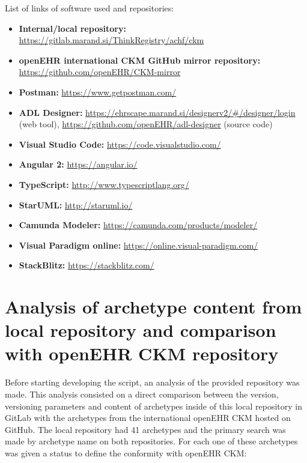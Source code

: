 \documentclass[mim_thesis.tex]{subfiles}
\begin{document}
List of links of software used and repositories: 
\begin{itemize}[noitemsep]
\item \textbf{Internal/local repository:} \url{https://gitlab.marand.si/ThinkRegistry/achf/ckm}
\item \textbf{openEHR international CKM GitHub mirror repository:} \url{https://github.com/openEHR/CKM-mirror}
\item \textbf{Postman:} \url{https://www.getpostman.com/}
\item \textbf{ADL Designer:} \url{https://ehrscape.marand.si/designerv2/#/designer/login} (web tool), \url{https://github.com/openEHR/adl-designer} (source code)
\item \textbf{Visual Studio Code:} \url{https://code.visualstudio.com/}
\item \textbf{Angular 2:} \url{https://angular.io/}
\item \textbf{TypeScript:} \url{http://www.typescriptlang.org/}
\item \textbf{StarUML:} \url{http://staruml.io/}
\item \textbf{Camunda Modeler:} \url{https://camunda.com/products/modeler/}
\item \textbf{Visual Paradigm online:} \url{https://online.visual-paradigm.com/}
\item \textbf{StackBlitz:} \url{https://stackblitz.com/}

\end{itemize}


\section{Analysis of archetype content from local repository and comparison with openEHR CKM repository}
Before starting developing the script, an analysis of the provided repository was made. This analysis consisted on a direct comparison between the version, versioning parameters and content of archetypes inside of this local repository in GitLab with the archetypes from the international openEHR CKM hosted on GitHub. The local repository had 41 archetypes and the primary search was made by archetype name on both repositories. For each one of these archetypes was given a status to define the conformity with openEHR CKM: 
\end{document}
